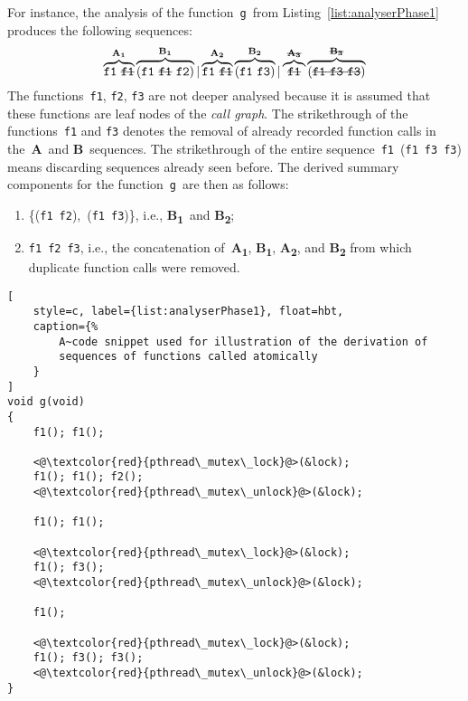 \begin{example}
    For instance, the analysis of the function~\texttt{g}~from
    Listing~\ref{list:analyserPhase1} produces the following sequences:
    $$
        \overbrace{%
            \text{\texttt{f1}~\sout{\texttt{f1}}}
        }^\text{\textbf{A\textsubscript{1}}}
        \overbrace{%
            (\text{\texttt{f1}~\sout{\texttt{f1}}~\texttt{f2}})
        }^\text{\textbf{B\textsubscript{1}}} |
        \overbrace{%
            \text{\texttt{f1}~\sout{\texttt{f1}}}
        }^\text{\textbf{A\textsubscript{2}}}
        \overbrace{%
            (\text{\texttt{f1}~\texttt{f3}})
        }^\text{\textbf{B\textsubscript{2}}} |
        \overbrace{%
            \text{\sout{\texttt{f1}}}
        }^\text{\sout{\textbf{A\textsubscript{3}}}}
        \overbrace{%
            (\text{\sout{\texttt{f1}~\texttt{f3}~\texttt{f3}}})
        }^\text{\sout{\textbf{B\textsubscript{3}}}}
    $$
    The functions~\texttt{f1}, \texttt{f2}, \texttt{f3} are not deeper
    analysed because it is assumed that these functions are leaf nodes
    of the \emph{call graph}.
    The strikethrough of the functions~\texttt{f1} and \texttt{f3} denotes
    the removal of already recorded function calls in
    the~\textbf{A}~and \textbf{B}~sequences. The strikethrough of the
    entire sequence~\texttt{f1}~(\texttt{f1}~\texttt{f3}~\texttt{f3})
    means discarding sequences already seen before. The derived summary
    components for the function~\texttt{g}~are then as follows:
    \begin{enumerate}[label={(\roman*)}]
        \item
           \{(\texttt{f1}~\texttt{f2}),~(\texttt{f1}~\texttt{f3})\}, i.e.,
           \textbf{B\textsubscript{1}}~and \textbf{B\textsubscript{2}};

        \item
            \texttt{f1}~\texttt{f2}~\texttt{f3}, i.e.,
            the concatenation of~\textbf{A\textsubscript{1}},
            \textbf{B\textsubscript{1}}, \textbf{A\textsubscript{2}},
            and \textbf{B\textsubscript{2}} from which duplicate
            function calls were removed.

    \end{enumerate}
\end{example}

\begin{lstlisting}[
    style=c, label={list:analyserPhase1}, float=hbt,
    caption={%
        A~code snippet used for illustration of the derivation of
        sequences of functions called atomically
    }
]
void g(void)
{
    f1(); f1();

    <@\textcolor{red}{pthread\_mutex\_lock}@>(&lock);
    f1(); f1(); f2();
    <@\textcolor{red}{pthread\_mutex\_unlock}@>(&lock);

    f1(); f1();

    <@\textcolor{red}{pthread\_mutex\_lock}@>(&lock);
    f1(); f3();
    <@\textcolor{red}{pthread\_mutex\_unlock}@>(&lock);

    f1();

    <@\textcolor{red}{pthread\_mutex\_lock}@>(&lock);
    f1(); f3(); f3();
    <@\textcolor{red}{pthread\_mutex\_unlock}@>(&lock);
}
\end{lstlisting}

